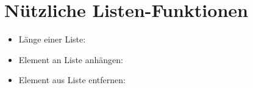 
%
\subtitle{Listen}
\subtitle{Kapitel 5: ganz viele Variablen in einer}

\section{Nützliche Listen-Funktionen}\label{sec:nutzliche-listen-funktionen}
\begin{frame}
    \slidehead
    \begin{itemize}
        \item Länge einer Liste:
    \end{itemize}
\end{frame}

\begin{frame}
    \slidehead
    \begin{itemize}
        \item Element an Liste anhängen:
            \pause
        \item Element aus Liste entfernen:
    \end{itemize}
\end{frame}

